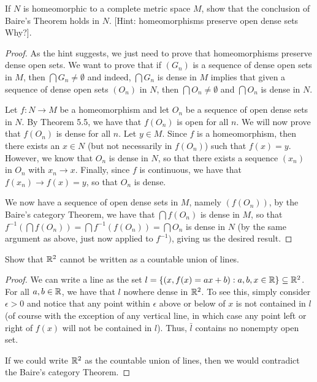 \begin{exercise}{43}
If $N$ is homeomorphic to a complete metric space $M$, show that the conclusion of Baire's Theorem holds in $N$.
[Hint: homeomorphisms preserve open dense sets
Why?].
\end{exercise}
\begin{proof}
As the hint suggests, we just need to prove that homeomorphisms preserve dense open sets.
We want to prove that if $(G_n)$ is a sequence of dense open sets in $M$, then $\bigcap G_n \neq \emptyset$ and indeed, $\bigcap G_n$ is dense in $M$ implies that given a sequence of dense open sets $(O_n)$ in $N$, then $\bigcap O_n \neq \emptyset$ and $\bigcap O_n$ is dense in $N$.

Let $f: N\to M$ be a homeomorphism and let $O_n$ be a sequence of open dense sets in $N$.
By Theorem 5.5, we have that $f(O_n)$ is open for all $n$.
We will now prove that $f(O_n)$ is dense for all $n$.
Let $y \in M$.
Since $f$ is a homeomorphism, then there exists an $x \in N$ (but not necessarily in $f(O_n)$) such that $f(x) = y$.
However, we know that $O_n$ is dense in $N$, so that there exists a sequence $(x_n)$ in $O_n$ with $x_n \to x$.
Finally, since $f$ is continuous, we have that $f(x_n) \to f(x) = y$, so that $O_n$ is dense.

We now have a sequence of open dense sets in $M$, namely $(f(O_n))$, by the Baire's category Theorem, we have that $\bigcap f(O_n)$ is dense in $M$, so that $f^{-1}(\bigcap f(O_n)) = \bigcap f^{-1}(f(O_n)) = \bigcap O_n$ is dense in $N$ (by the same argument as above, just now applied to $f^{-1})$, giving us the desired result.
\end{proof} 

\begin{exercise}{46}
Show that $\mathbb{R}^2$ cannot be written as a countable union of lines.
\end{exercise}
\begin{proof}
We can write a line as the set $l = \{(x,f(x) = ax+b): a,b,x \in \mathbb{R}\} \subseteq \mathbb{R}^2$.
For all $a,b \in \mathbb{R}$, we have that $l$ nowhere dense in $\mathbb{R}^2$.
To see this, simply consider $\epsilon>0$ and notice that any point within $\epsilon$ above or below of $x$ is not contained in $l$ (of course with the exception of any vertical line, in which case any point left or right of $f(x)$ will not be contained in $l$).
Thus, $\bar{l}$ contains no nonempty open set.

If we could write $\mathbb{R}^2$ as the countable union of lines, then we would contradict the Baire's category Theorem.
\end{proof} 

